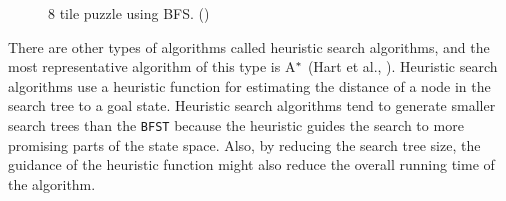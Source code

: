 \iftrue
\begin{landscape}
\begin{figure}[htb]

\resizebox{\dimexpr\linewidth-1cm}{!}{%
\begin{forest}
[\usebox\myboxbfsone
  [\usebox\myboxbfstwo
	[\usebox\myboxbfsfive
		[\usebox\myboxbfsten
			[\usebox\myboxbfstwenty
				[\usebox\myboxbfsthirtyfour]
				[\usebox\myboxbfsthirtyfive]			
			]		
		]
		[\usebox\myboxbfseleven
			[\usebox\myboxbfstwentyone
				[\usebox\myboxbfsthirtysix]
				[\usebox\myboxbfsthirtyseven]			
			]
			[\usebox\myboxbfstwentytwo
				[\usebox\myboxbfsthirtyeight]
				[\usebox\myboxbfsthirtynine]			
			]
			[\usebox\myboxbfstwentythree
				[\usebox\myboxbfsforty]
				[\usebox\myboxbfsfortyone]			
			]		
		]	
	]  
  ]
  [\usebox\myboxbfsthree
	[\usebox\myboxbfssix
		[\usebox\myboxbfstwelve
			[\usebox\myboxbfstwentyfour
				[\usebox\myboxbfsfortytwo]
				[\usebox\myboxbfsfortythree]			
			]		
		]
		[\usebox\myboxbfsthirteen
			[\usebox\myboxbfstwentyfive
				[\usebox\myboxbfsfortyfour]
				[\usebox\myboxbfsfortyfive]			
			]		
		]	
	]
	[\usebox\myboxbfsseven
		[\usebox\myboxbfsfourteen
			[\usebox\myboxbfstwentysix
				[\usebox\myboxbfsfortysix]			
			]		
		]
		[\usebox\myboxbfsfifteen
			[\usebox\myboxbfstwentyseven]		
		]	
	]
	[\usebox\myboxbfseight
		[\usebox\myboxbfssixteen
			[\usebox\myboxbfstwentyeight]		
		]
		[\usebox\myboxbfsseventeen
			[\usebox\myboxbfstwentynine]		
		]	
	]  
  ]
  [\usebox\myboxbfsfour
	[\usebox\myboxbfsnine
		[\usebox\myboxbfseighteen
			[\usebox\myboxbfsthirty]
			[\usebox\myboxbfsthirtyone]
			[\usebox\myboxbfsthirtytwo]
		]
		[\usebox\myboxbfsnineteen
			[\usebox\myboxbfsthirtythree]		
		]
	]  
  ]
]
\end{forest}
}
\caption{8 tile puzzle using BFS. (\cite{bernard2011})} \label{fig:bfs_solution}
\end{figure}
\end{landscape}
\fi

There are other types of algorithms called heuristic search algorithms, and the most representative algorithm of this type is A$\sp{*}$ (Hart et al., \citeyear{hart1968formal}). %
Heuristic search algorithms use a heuristic function for estimating the distance of a node in the search tree to a goal state. Heuristic search algorithms tend to generate smaller search trees than the \texttt{BFST} because the heuristic guides the search to more promising parts of the state space. Also, by reducing the search tree size, the guidance of the heuristic function might also reduce the overall running time of the algorithm.

